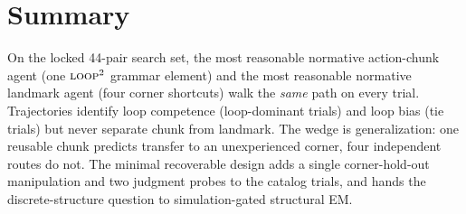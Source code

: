 \documentclass[10pt]{article}
\begin{document}
\section{Summary}

On the locked 44-pair search set, the most reasonable normative action-chunk agent (one
$\textsc{loop}^2$ grammar element) and the most reasonable normative landmark agent (four
corner shortcuts) walk the \emph{same} path on every trial. Trajectories identify loop
competence (loop-dominant trials) and loop bias (tie trials) but never separate chunk from
landmark. The wedge is generalization: one reusable chunk predicts transfer to an
unexperienced corner, four independent routes do not. The minimal recoverable design adds a
single corner-hold-out manipulation and two judgment probes to the catalog trials, and
hands the discrete-structure question to simulation-gated structural EM.
\end{document}
